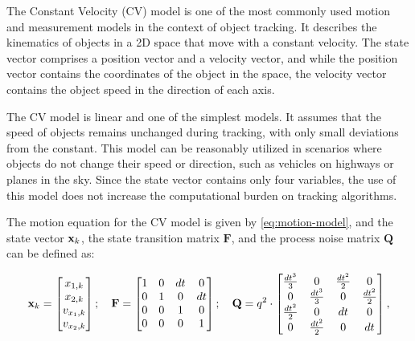 The Constant Velocity (CV) model is one of the most commonly used motion and measurement models in the context of object tracking. It describes the kinematics of objects in a 2D space that move with a constant velocity. The state vector comprises a position vector and a velocity vector, and while the position vector contains the coordinates of the object in the space, the velocity vector contains the object speed in the direction of each axis.

The CV model is linear and one of the simplest models. It assumes that the speed of objects remains unchanged during tracking, with only small deviations from the constant. This model can be reasonably utilized in scenarios where objects do not change their speed or direction, such as vehicles on highways or planes in the sky. Since the state vector contains only four variables, the use of this model does not increase the computational burden on tracking algorithms.

The motion equation for the CV model is given by \ref{eq:motion-model}, and the state vector $\vecat{x}{k}$, the state transition matrix $\mathbf{F}$, and the process noise matrix $\mathbf{Q}$ can be defined as:

\begin{equation}
    \vecat{x}{k} =
    \begin{bmatrix}
        x_{1,k} \\ 
        x_{2,k} \\ 
        v_{x_1,k} \\ 
        v_{x_2,k}
    \end{bmatrix};
    \quad
    \mathbf{F} =
    \begin{bmatrix}
       1 & 0 & dt & 0 \\
       0 & 1 & 0 & dt \\
       0 & 0 & 1 &  0 \\
       0 & 0 & 0 &  1 
    \end{bmatrix};
    \quad
    \mathbf{Q} = q^2 \cdot
    \begin{bmatrix}
        \frac{dt^3}{3}    & 0                 & \frac{dt^{2}}{2}  & 0  \\
        0                 & \frac{dt^3}{3}    & 0                 & \frac{dt^{2}}{2} \\
        \frac{dt^{2}}{2}  & 0                 & dt                & 0 \\
        0                 & \frac{dt^{2}}{2}  & 0                 & dt
    \end{bmatrix},
\end{equation}

